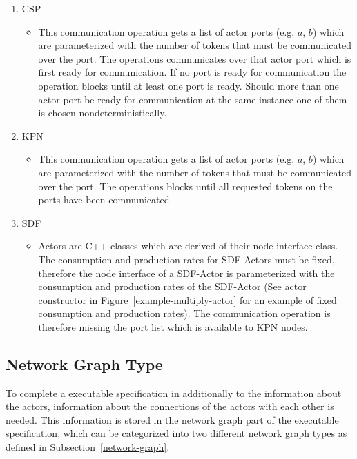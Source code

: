 \begin{enumerate}
\item CSP
  \begin{itemize}
  \item  {}

    This communication operation gets a list of actor ports (e.g. $a$, $b$) which
    are parameterized with the number of tokens that must be communicated
    over the port. The operations communicates over that actor port which is first ready
    for communication. If no port is ready for communication the operation blocks until
    at least one port is ready. Should more than one actor port be ready for
    communication at the same instance one of them is chosen nondeterministically.
  \end  {itemize}
\item KPN
  \begin{itemize}
  \item {}

    This communication operation gets a list of actor ports (e.g. $a$, $b$) which
    are parameterized with the number of tokens that must be communicated
    over the port. The operations blocks until all requested tokens on the ports
    have been communicated.
  \end  {itemize}
\item SDF
  \begin{itemize}
  \item {}

    Actors are C++ classes which are derived of their node interface class.
    The consumption and production rates for SDF Actors must be fixed, therefore
    the node interface of a SDF-Actor is parameterized with the consumption and production
    rates of the SDF-Actor (See actor constructor in Figure~\ref{example-multiply-actor} for an
    example of fixed consumption and production rates). The communication operation  is
    therefore missing the port list which is available to KPN nodes.
  \end  {itemize}
\end{enumerate}

\subsection{Network Graph Type}

To complete a executable specification in \SysteMoC{} additionally
to the information about the actors, information about the connections
of the actors with each other is needed. This information is stored
in the network graph part of the executable specification, which can
be categorized into two different network graph types as defined in
Subsection~\ref{network-graph}.

